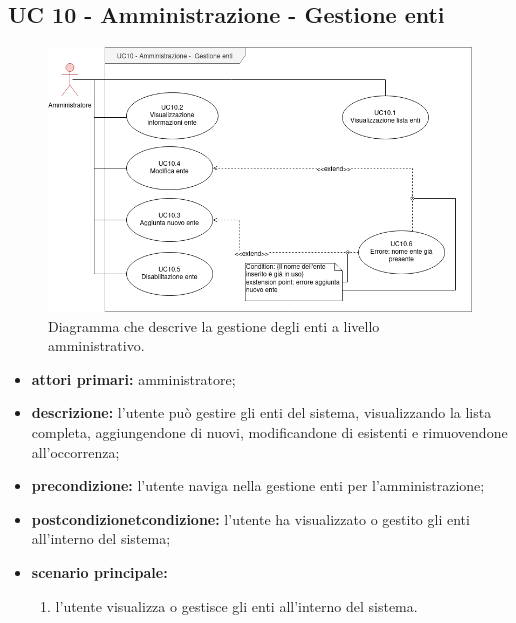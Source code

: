 \subsection{UC 10 - Amministrazione - Gestione enti}

		\begin{figure}[H]
			\centering
			\includegraphics[scale=0.60]{res/images/uc10}
			\caption{Diagramma che descrive la gestione degli enti a livello amministrativo.}
		\end{figure}

		\begin{itemize}
			\item \textbf{attori primari:} amministratore;
			\item \textbf{descrizione:} l'utente può gestire gli enti del sistema, visualizzando la lista completa, aggiungendone di nuovi, modificandone di esistenti e rimuovendone all'occorrenza;
			\item \textbf{precondizione:} l'utente naviga nella gestione enti per l'amministrazione;
			\item \textbf{postcondizionetcondizione:} l'utente ha visualizzato o gestito gli enti all'interno del sistema;
			\item \textbf{scenario principale:}
			\begin{enumerate}
				\item{l'utente visualizza o gestisce gli enti all'interno del sistema.}
			\end{enumerate}
		\end{itemize}

